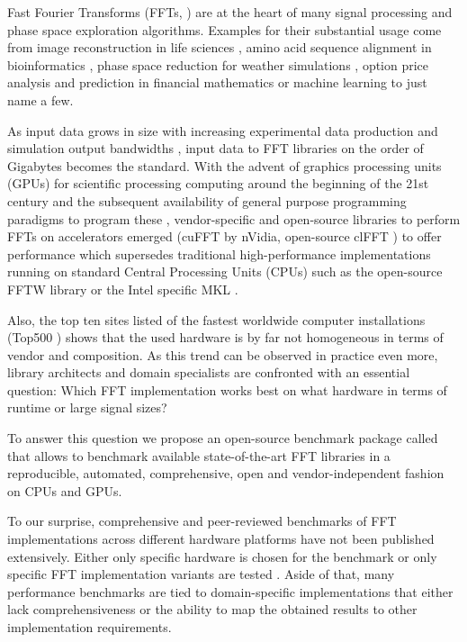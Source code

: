 Fast Fourier Transforms (FFTs, \citep{van1992computational}) are at the heart of many signal processing and phase space exploration algorithms. Examples for their substantial usage come from image reconstruction in life sciences \citep{preibisch2014efficient,schmid2015real}, amino acid sequence alignment in bioinformatics \citep{katoh2002mafft}, phase space reduction for weather simulations \citep{maronga2015parallelized}, option price analysis and prediction in financial mathematics \citep{hurd2010fourier} or machine learning \citep{dlstudy} to just name a few.

As input data grows in size with increasing experimental data production \citep{huisken2004optical} and simulation output bandwidths \citep{maronga2015parallelized}, input data to FFT libraries on the order of Gigabytes becomes the standard. With the advent of graphics processing units (GPUs) for scientific processing computing around the beginning of the 21st century and the subsequent availability of general purpose programming paradigms to program these \citep{du2012cuda}, vendor-specific and open-source libraries to perform FFTs on accelerators emerged (cuFFT \citep{nvidia2010cufft} by nVidia, open-source clFFT \citep{clfft}) to offer performance which supersedes traditional high-performance implementations running on standard Central Processing Units (CPUs) such as the open-source FFTW library \citep{FFTW05} or the Intel specific MKL \citep{intel2007intel}.

Also, the top ten sites listed of the fastest worldwide computer installations (Top500 \citep{meuer2011top500}) shows that the used hardware is by far not homogeneous in terms of vendor and composition. As this trend can be observed in practice even more, library architects and domain specialists are confronted with an essential question: Which FFT implementation works best on what hardware in terms of runtime or large signal sizes?  

To answer this question we propose an open-source benchmark package called \gearshifft{} \citep{gearshifft_github} that allows to benchmark available state-of-the-art FFT libraries in a reproducible, automated, comprehensive, open and vendor-independent fashion on CPUs and GPUs.

To our surprise, comprehensive and peer-reviewed benchmarks of FFT implementations across different hardware platforms have not been published extensively. Either only specific hardware is chosen for the benchmark \citep{park2015fast,eleftheriou2005performance,Akin:15} or only specific FFT implementation variants are tested \citep{shoc2010,dongarra2013hpc}. Aside of that, many performance benchmarks are tied to domain-specific implementations \citep{fialka2006fft} that either lack comprehensiveness or the ability to map the obtained results to other implementation requirements.

